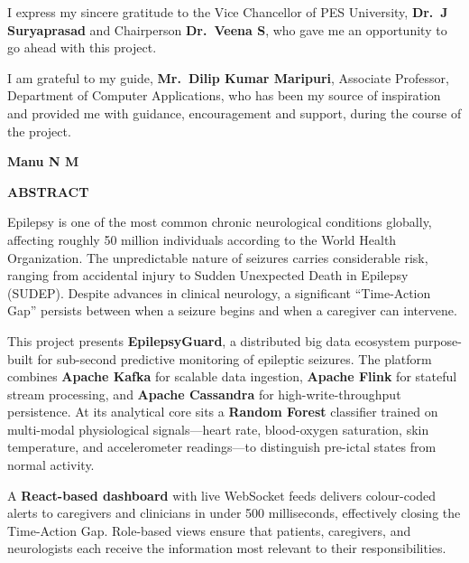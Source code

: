 \documentclass[12pt, a4paper, oneside]{report}
\begin{document}
\vspace{0.5cm}
\noindent I express my sincere gratitude to the Vice Chancellor of PES University, \textbf{Dr.\ J Suryaprasad} and Chairperson \textbf{Dr.\ Veena S}, who gave me an opportunity to go ahead with this project.

\vspace{0.5cm}
\noindent I am grateful to my guide, \textbf{Mr.\ Dilip Kumar Maripuri}, Associate Professor, Department of Computer Applications, who has been my source of inspiration and provided me with guidance, encouragement and support, during the course of the project.

\vspace{3cm}
\begin{flushright}
    \textbf{Manu N M}
\end{flushright}

\newpage
\thispagestyle{empty}
\begin{center}
    {\Large \textbf{ABSTRACT} \par}
    \vspace{1.5cm}
\end{center}

\noindent Epilepsy is one of the most common chronic neurological conditions globally, affecting roughly 50 million individuals according to the World Health Organization. The unpredictable nature of seizures carries considerable risk, ranging from accidental injury to Sudden Unexpected Death in Epilepsy (SUDEP). Despite advances in clinical neurology, a significant ``Time-Action Gap'' persists between when a seizure begins and when a caregiver can intervene.

\vspace{0.5cm}
\noindent This project presents \textbf{EpilepsyGuard}, a distributed big data ecosystem purpose-built for sub-second predictive monitoring of epileptic seizures. The platform combines \textbf{Apache Kafka} for scalable data ingestion, \textbf{Apache Flink} for stateful stream processing, and \textbf{Apache Cassandra} for high-write-throughput persistence. At its analytical core sits a \textbf{Random Forest} classifier trained on multi-modal physiological signals---heart rate, blood-oxygen saturation, skin temperature, and accelerometer readings---to distinguish pre-ictal states from normal activity.

\vspace{0.5cm}
\noindent A \textbf{React-based dashboard} with live WebSocket feeds delivers colour-coded alerts to caregivers and clinicians in under 500 milliseconds, effectively closing the Time-Action Gap. Role-based views ensure that patients, caregivers, and neurologists each receive the information most relevant to their responsibilities.
\end{document}
